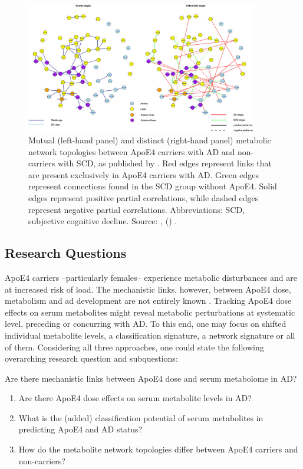 \documentclass{amsart}
\begin{document}
\begin{figure}[htb]
\vspace*{-0.2cm}
  \includegraphics[width=0.9\textwidth]{figures/network.jpeg}
    \caption{Mutual (left-hand panel) and distinct (right-hand panel) metabolic network topologies between ApoE4 carriers with AD and non-carriers with SCD, as published by \citeauthor{deLeeuw2017Blood-basedDisease}. Red edges represent links that are present exclusively in ApoE4 carriers with AD. Green edges represent connections found in the SCD group without ApoE4. Solid edges represent positive partial correlations, while dashed edges represent negative partial correlations. Abbreviations: SCD, subjective cognitive decline. Source: , \citeauthor{deLeeuw2017Blood-basedDisease} (\citeyear{deLeeuw2017Blood-basedDisease}) \cite{deLeeuw2017Blood-basedDisease}.}
  \label{netan17}
\end{figure}

\newpage
\subsection{Research Questions}
ApoE4 carriers --particularly females-- experience metabolic disturbances and are at increased risk of \acrshort{load}. The mechanistic links, however, between ApoE4 dose, metabolism and \acrshort{ad} development are not entirely known \cite{Fernandez-Calle2022APOEDiseases}. Tracking ApoE4 dose effects on serum metabolites might reveal metabolic perturbations at systematic level, preceding or concurring with AD. To this end, one may focus on shifted individual metabolite levels, a classification signature, a network signature or all of them. Considering all three approaches, one could state the following overarching research question and subquestions:

Are there mechanistic links between ApoE4 dose and serum metabolome in AD?
\begin{enumerate}[label=\roman*]
    \item Are there ApoE4 dose effects on serum metabolite levels in AD?
    \item What is the (added) classification potential of serum metabolites in predicting ApoE4 and AD status?   
    \item How do the metabolite network topologies differ between ApoE4 carriers and non-carriers?
\end{enumerate}
\end{document}
